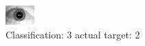 \begin{figure}[h!]
\begin{center}
\includegraphics[width=0.60\columnwidth]{figures/ID1718_class_3_target_2.png}
\end{center}
\caption{ Classification: 3 actual target: 2}
\label{fig:ID1718_class_3_target_2}
\end{figure}

